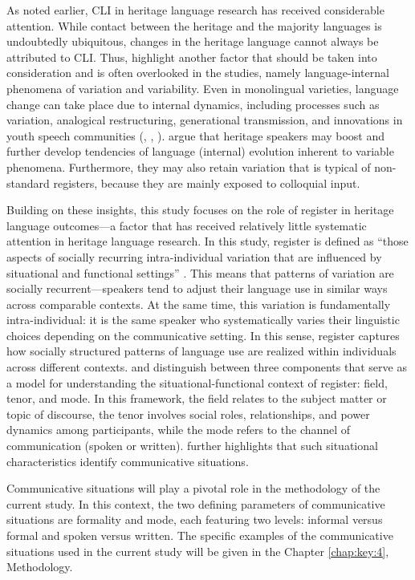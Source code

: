 As noted earlier, CLI in heritage language research has received considerable attention. While contact between the heritage and the majority languages is undoubtedly ubiquitous, changes in the heritage language cannot always be attributed to CLI. Thus, \citet{FloresRinke2020} highlight another factor that should be taken into consideration and is often overlooked in the studies, namely language-internal phenomena of variation and variability. Even in monolingual varieties, language change can take place due to internal dynamics, including processes such as variation, analogical restructuring, generational transmission, and innovations in youth speech communities (\citealt{Labov1994, Labov2001, Labov2010}, \citealt{PoplackLevey2010}, \citealt{Tagliamonte2016}). \citet{FloresRinke2020} argue that heritage speakers may boost and further develop tendencies of language (internal) evolution inherent to variable phenomena. Furthermore, they may also retain variation that is typical of non-standard registers, because they are mainly exposed to colloquial input.

Building on these insights, this study focuses on the role of register in heritage language outcomes—a factor that has received relatively little systematic attention in heritage language research. In this study, register is defined as “those aspects of socially recurring intra-individual variation that are influenced by situational and functional settings” \citep[3]{ludeling_register_2022}. This means that patterns of variation are socially recurrent—speakers tend to adjust their language use in similar ways across comparable contexts. At the same time, this variation is fundamentally intra-individual: it is the same speaker who systematically varies their linguistic choices depending on the communicative setting. In this sense, register captures how socially structured patterns of language use are realized within individuals across different contexts. \citet{HallidayEtAl1964} and \citet{Halliday1989} distinguish between three components that serve as a model for understanding the situational-functional context of register: field, tenor, and mode. In this framework, the field relates to the subject matter or topic of discourse, the tenor involves social roles, relationships, and power dynamics among participants, while the mode refers to the channel of communication (spoken or written). \citet{Wiese2021} further highlights that such situational characteristics identify communicative situations.

Communicative situations will play a pivotal role in the methodology of the current study. In this context, the two defining parameters of communicative situations are formality and mode, each featuring two levels: informal versus formal and spoken versus written. The specific examples of the communicative situations used in the current study will be given in the Chapter \ref{chap:key:4}, Methodology.

